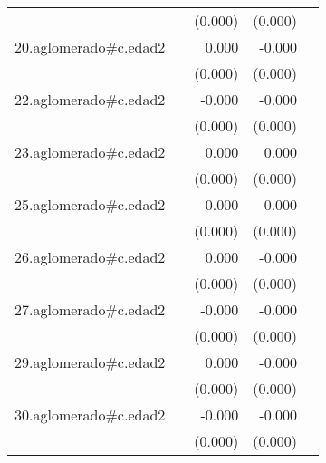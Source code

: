 {\begin{longtable}{l*{4}{D{.}{.}{-1}}}
            &                     &     (0.000)         &     (0.000)         &                     \\
\addlinespace
20.aglomerado#c.edad2&                     &       0.000         &      -0.000         &                     \\
            &                     &     (0.000)         &     (0.000)         &                     \\
\addlinespace
22.aglomerado#c.edad2&                     &      -0.000         &      -0.000         &                     \\
            &                     &     (0.000)         &     (0.000)         &                     \\
\addlinespace
23.aglomerado#c.edad2&                     &       0.000         &       0.000         &                     \\
            &                     &     (0.000)         &     (0.000)         &                     \\
\addlinespace
25.aglomerado#c.edad2&                     &       0.000         &      -0.000         &                     \\
            &                     &     (0.000)         &     (0.000)         &                     \\
\addlinespace
26.aglomerado#c.edad2&                     &       0.000         &      -0.000         &                     \\
            &                     &     (0.000)         &     (0.000)         &                     \\
\addlinespace
27.aglomerado#c.edad2&                     &      -0.000         &      -0.000         &                     \\
            &                     &     (0.000)         &     (0.000)         &                     \\
\addlinespace
29.aglomerado#c.edad2&                     &       0.000         &      -0.000         &                     \\
            &                     &     (0.000)         &     (0.000)         &                     \\
\addlinespace
30.aglomerado#c.edad2&                     &      -0.000         &      -0.000\sym{***}&                     \\
            &                     &     (0.000)         &     (0.000)         &                     \\

\end{longtable}}
